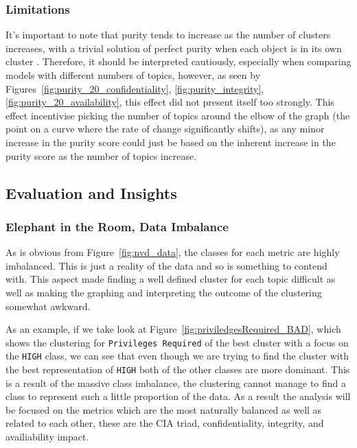 \documentclass[12pt]{article}
\begin{document}
\subsubsection*{Limitations}

It's important to note that purity tends to increase as the number of clusters increases, with a
trivial solution of perfect purity when each object is in its own cluster \cite{v-measure}.
Therefore, it should be interpreted cautiously, especially when comparing models with different
numbers of topics, however, as seen by Figures~\ref{fig:purity_20_confidentiality}, \ref{fig:purity_integrity},
\ref{fig:purity_20_availability}, this effect did not present
itself too strongly. This effect incentivise picking the number of topics around the elbow of the
graph (the point on a curve where the rate of change significantly shifts), as any minor increase in
the purity score could just be based on the inherent increase in the purity score as the number of
topics increase.





\subsection{Evaluation and Insights}

\subsubsection*{Elephant in the Room, Data Imbalance}

As is obvious from Figure~\ref{fig:nvd_data}, the classes for each metric are highly imbalanced.
This is just a reality of the data and so is something to contend with. This aspect
made finding a well defined cluster for each topic difficult as well as making the graphing and
interpreting the outcome of the clustering somewhat awkward.

As an example, if we take look at Figure~\ref{fig:priviledgesRequired_BAD}, which shows the
clustering for \texttt{Privileges Required}  of the best cluster with a focus on the \texttt{HIGH} class, we
can see that even though we are trying to find the cluster with the best representation of
\texttt{HIGH} both of the other classes are more dominant. This is a result of the massive class
imbalance, the clustering cannot manage to find a class to represent such a little proportion of the
data. As a result the analysis will be focused on the metrics which are the most naturally balanced
as well as related to each other, these are the CIA triad, confidentiality, integrity, and availiability
impact.
\end{document}
